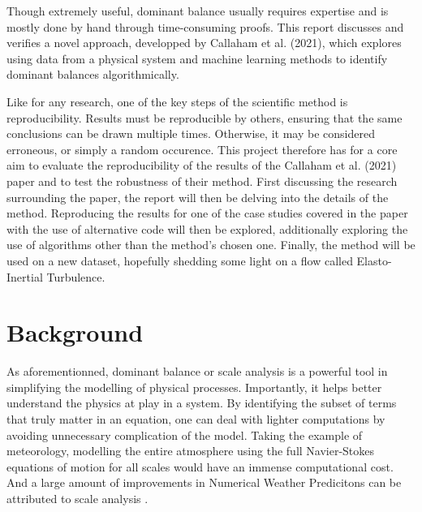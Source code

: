 \documentclass[12pt]{report} %
\begin{document}
\vspace{5mm}

Though extremely useful, dominant balance usually requires expertise and is mostly done by hand through time-consuming proofs. This report discusses and verifies a novel approach, developped by Callaham et al. (2021)\cite{callaham2021learning}, which explores using data from a physical system and machine learning methods to identify dominant balances algorithmically.

\vspace{5mm}

Like for any research, one of the key steps of the scientific method is reproducibility. Results must be reproducible by others, ensuring that the same conclusions can be drawn multiple times. Otherwise, it may be considered erroneous, or simply a random occurence. This project therefore has for a core aim to evaluate the reproducibility of the results of the Callaham et al. (2021)\cite{callaham2021learning} paper and to test the robustness of their method. First discussing the research surrounding the paper, the report will then be delving into the details of the method. Reproducing the results for one of the case studies covered in the paper with the use of alternative code will then be explored, additionally exploring the use of algorithms  other than the method's chosen one. Finally, the method will be used on a new dataset, hopefully shedding some light on a flow called Elasto-Inertial Turbulence.



\chapter{Background}


As aforementionned, dominant balance or scale analysis is a powerful tool in simplifying the modelling of physical processes. Importantly, it helps better understand the physics at play in a system. By identifying the subset of terms that truly matter in an equation, one can deal with lighter computations by avoiding unnecessary complication of the model. Taking the example of meteorology, modelling the entire atmosphere using the full Navier-Stokes equations of motion for all scales would have an immense computational cost. And a large amount of improvements in Numerical Weather Predicitons can be attributed to scale analysis \cite{charney1947dynamics, phillips1963geostrophic, burger1958scale, yano2009scale}.

\vspace{5mm}
\end{document}
